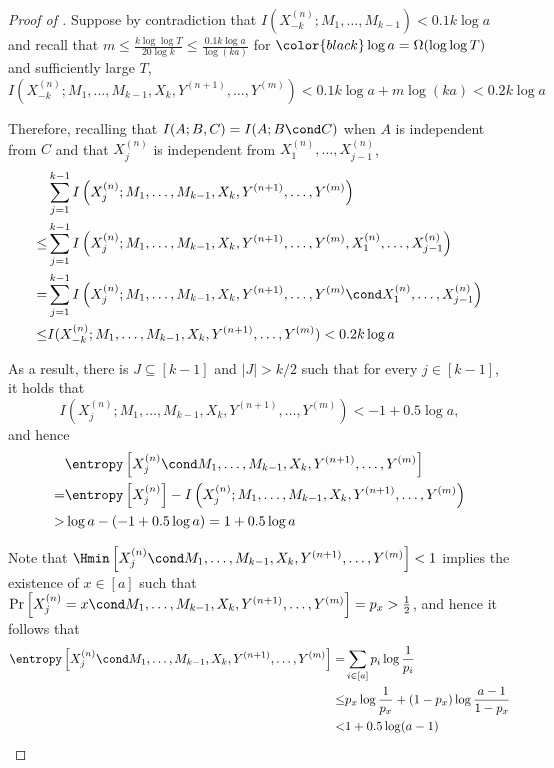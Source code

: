 \begin{proof}[Proof of ]
		Suppose  by contradiction that
		$I\left(X^{(n)}_{-k}; M_1,\ldots, M_{k-1}\right)<0.1 k\log a$ and recall that $m \le\frac{k\log\log T}{20\log k} \le\frac{0.1 k\log a}{\log (ka)}$ for ${\color{black}\log a=\Omega(\log \log T)}$ and sufficiently large $T$,
		$$ I\left(X^{(n)}_{-k}; M_1,\ldots, M_{k-1}, X_k, Y^{(n+1)},\ldots, Y^{(m)} \right)<0.1 k\log a + {m\log(ka)}<0.2 k\log a$$

		Therefore, recalling that $I(A;B,C)=I(A;B\cond C)$ when $A$ is independent from $C$ and that $X_j^{(n)}$ is independent from $X^{(n)}_1,\ldots, X^{(n)}_{j-1}$, 
		\begin{align*}
			& \sum_{j=1}^{k-1} I\left(X^{(n)}_{j}; M_1,\ldots, M_{k-1}, X_k, Y^{(n+1)},\ldots, Y^{(m)} \right) \\
			\le & \sum_{j=1}^{k-1} I\left(X^{(n)}_{j}; M_1,\ldots, M_{k-1}, X_k, Y^{(n+1)},\ldots, Y^{(m)}, X^{(n)}_1,\ldots, X^{(n)}_{j-1} \right) \\
			= & \sum_{j=1}^{k-1} I\left(X^{(n)}_{j}; M_1,\ldots, M_{k-1}, X_k, Y^{(n+1)},\ldots, Y^{(m)} \cond X^{(n)}_1,\ldots, X^{(n)}_{j-1} \right)\\
			\le & I(X^{(n)}_{-k}; M_1,\ldots, M_{k-1}, X_k, Y^{(n+1)},\ldots, Y^{(m)} ) <0.2 k\log a
		\end{align*}
		
		As a result, there is $J\subseteq [k-1]$ and $|J|>k/2$ such that for every $j\in [k-1]$, it holds that
		$$I\left(X^{(n)}_{j}; M_1,\ldots, M_{k-1}, X_k, Y^{(n+1)},\ldots, Y^{(m)} \right)<-1+ 0.5\log a,$$
		and hence 
		\begin{align}
			&\entropy\left[X^{(n)}_{j} \cond M_1,\ldots, M_{k-1}, X_k, Y^{(n+1)},\ldots, Y^{(m)} \right] \notag\\
			= &\entropy\left[X^{(n)}_{j}\right] -  I\left(X^{(n)}_{j}; M_1,\ldots, M_{k-1}, X_k, Y^{(n+1)},\ldots, Y^{(m)} \right)\notag\\
			>& \log a - (-1+ 0.5\log a) = 1+ 0.5\log a \label{ineq:lower bound for H}
		\end{align}
	
		Note that
		$\Hmin\left[X^{(n)}_{j} \cond M_1,\ldots, M_{k-1}, X_k, Y^{(n+1)},\ldots, Y^{(m)} \right] <1$ implies the existence of $x\in [a]$ such that  $\Pr\left[X^{(n)}_{j}=x \cond M_1,\ldots, M_{k-1}, X_k, Y^{(n+1)},\ldots, Y^{(m)} \right]=p_x>\frac{1}{2}$,
		and hence it follows that 
		\begin{align}
			\entropy\left[X^{(n)}_{j} \cond M_1,\ldots, M_{k-1}, X_k, Y^{(n+1)},\ldots, Y^{(m)} \right] 
			=& \sum_{i\in[a]} p_i\log\frac{1}{p_i} \notag \\
			\le & p_x\log \frac{1}{p_x}+(1-p_x)\log\frac{a-1}{1-p_x}\notag\\
			< & 1+0.5\log (a-1) \label{ineq:upper bound for H}
		\end{align}


\end{proof}

